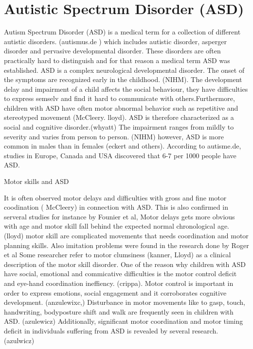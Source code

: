\section{Autistic Spectrum Disorder (ASD)}
\label{sec:asd}

Autism Spectrum Disorder (ASD) is a medical term for a collection of different autistic disorders. (autismus.de ) which includes autistic disorder, asperger disorder and pervasive developmental disorder. These disorders are often practically hard to distinguish and for that reason a medical term ASD was established.  ASD is a complex neurological developmental disorder. The onset of the symptoms are recognized early in the childhood. (NIHM). The development delay and impairment of a child affects the social behaviour, they have difficulties to express semselv and find it hard to communicate with others.Furthermore, children with ASD have often motor abnormal behavior such as repetitive and stereotyped movement (McCleery. lloyd).  ASD is therefore characterized as a social and cognitive disorder.(whyatt) The impairment ranges from mildly to severity and varies from person to person. (NIHM) however, ASD is more common in males than in females (eckert and others). According to autisme.de, studies in Europe, Canada and USA discovered that 6-7 per 1000 people have ASD. 



Motor skills and ASD

It is often observed motor delays and difficulties with gross and fine motor coodination ( McCleery) in connection with ASD.  This is also confirmed in serveral studies for instance by Founier et al, Motor delays gets more obvious with age and motor skill fall behind the expected normal chronological age. (lloyd) motor skill are complicated movements that needs coordination and motor planning skills. 
Also imitation problems were found in the research done by  Roger et al
Some researcher refer to motor clumsiness (kanner, Lloyd) as a clinical description of the motor skill disorder.
One of the reason why children with ASD have social, emotional and commicative difficulties is the motor control deficit and eye-hand coordination ineffiency. (crippa). Motor control is important in order to express emotions, social engagement and it corroborates cognitive development. (anzulewixc,) 
Disturbance in motor movements like to gasp, touch, handwriting, bodyposture shift and walk are frequently seen in children with ASD. (azulewicz) Additionally, significant motor coordination and motor timing deficit in individuals suffering from ASD is revealed by several research. (azulwicz)

